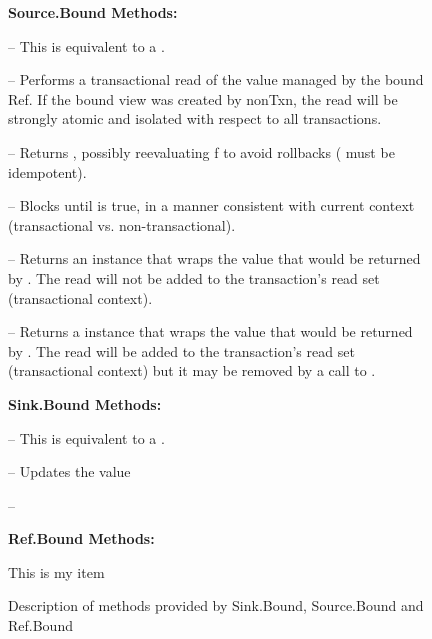\begin{figure}
\textbf{Source.Bound Methods:}
\begin{packed_itemize}
\item {} -- This is equivalent to a .
\item {} -- Performs a transactional read of the value 
managed by the bound Ref. If the bound view was created by nonTxn, the read will
be strongly atomic and isolated with respect to all transactions.
\item {} -- Returns , possibly 
reevaluating f to avoid rollbacks ( must be idempotent).
\item {} -- Blocks until  is true, in a 
manner consistent with current context (transactional vs. non-transactional).
\item {} -- Returns an  instance that 
wraps the value that would be returned by . The read will not be added to the transaction's read set (transactional context).
\item {} -- Returns a  instance that 
wraps the value that would be returned by . The read will be added to the transaction's read set (transactional context) but it may be removed by a call to 
.
\end{packed_itemize}

\textbf{Sink.Bound Methods:}
\begin{packed_itemize}
\item {} -- This is equivalent to a .
\item {} -- Updates the value 
\item {} -- 
\end{packed_itemize}

\textbf{Ref.Bound Methods:}

\begin{packed_itemize}
\item{This is my item}
\end{packed_itemize}

\caption{Description of methods provided by Sink.Bound, Source.Bound and Ref.Bound }
\end{figure}

